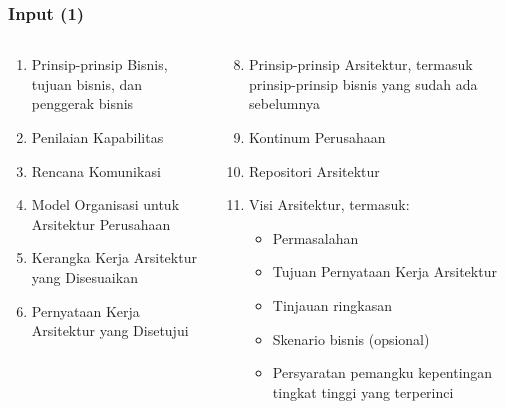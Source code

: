 \documentclass[aspectratio=169, table]{beamer}
\begin{document}
	\begin{frame}
		\frametitle{Input (1)}
		\begin{columns}
			\begin{column}{0.5\textwidth}
				\begin{center}
					\begin{enumerate}

						\item Prinsip-prinsip Bisnis, tujuan bisnis, dan penggerak bisnis
						\item Penilaian Kapabilitas
						\item Rencana Komunikasi
						\item Model Organisasi untuk Arsitektur Perusahaan
						\item Kerangka Kerja Arsitektur yang Disesuaikan
						\item Pernyataan Kerja Arsitektur yang Disetujui

					\end{enumerate}
				\end{center}
			\end{column}
			\begin{column}{0.5\textwidth}
				\begin{center}
					\begin{enumerate}
						\setcounter{enumi}{7}
						\item Prinsip-prinsip Arsitektur, termasuk prinsip-prinsip bisnis yang sudah ada sebelumnya
						\item Kontinum Perusahaan
						\item Repositori Arsitektur
						\item Visi Arsitektur, termasuk:
						\begin{itemize}
							\item Permasalahan
							\item Tujuan Pernyataan Kerja Arsitektur
							\item Tinjauan ringkasan
							\item Skenario bisnis (opsional)
							\item Persyaratan pemangku kepentingan tingkat tinggi yang terperinci
						\end{itemize}

					\end{enumerate}
				\end{center}
			\end{column}
		\end{columns}
	\end{frame}
\end{document}
